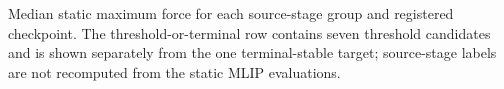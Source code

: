 Median static maximum force for each source-stage group and registered checkpoint. The threshold-or-terminal row contains seven threshold candidates and is shown separately from the one terminal-stable target; source-stage labels are not recomputed from the static MLIP evaluations.
